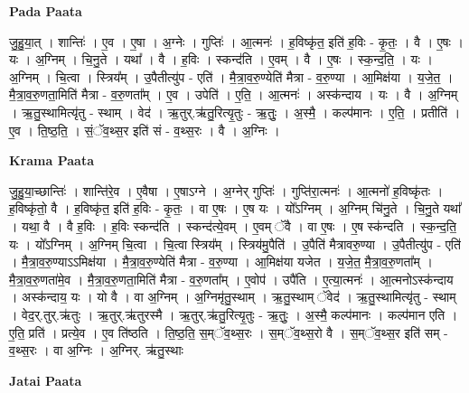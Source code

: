 \documentclass[17pt]{extarticle}
\begin{document}
\textbf{Pada Paata} \newline

जु॒हु॒या॒त् । शान्तिः॑ । ए॒व । ए॒षा । अ॒ग्नेः । गुप्तिः॑ । आ॒त्मनः॑ । ह॒विष्कृ॑त॒ इति॑ ह॒विः - कृ॒तः॒ । वै । ए॒षः । यः । अ॒ग्निम् । चि॒नु॒ते । यथा᳚ । वै । ह॒विः । स्कन्द॑ति । ए॒वम् । वै । ए॒षः । स्क॒न्द॒ति॒ । यः । अ॒ग्निम् । चि॒त्वा । स्त्रिय᳚म् । उ॒पैतीत्यु॑प - एति॑ । मै॒त्रा॒व॒रु॒ण्येति॑ मैत्रा - व॒रु॒ण्या । आ॒मिक्ष॑या । य॒जे॒त॒ । मै॒त्रा॒व॒रु॒णता॒मिति॑ मैत्रा - व॒रु॒णता᳚म् । ए॒व । उपेति॑ । ए॒ति॒ । आ॒त्मनः॑ । अस्क॑न्दाय । यः । वै । अ॒ग्निम् । ऋ॒तु॒स्थामित्यृ॑तु - स्थाम् । वेद॑ । ऋ॒तुर्.ऋ॑तु॒रित्यृ॒तुः - ऋ॒तुः॒ । अ॒स्मै॒ । कल्प॑मानः । ए॒ति॒ । प्रतीति॑ । ए॒व । ति॒ष्ठ॒ति॒ । सं॒ॅव॒थ्स॒र इति॑ सं - व॒थ्स॒रः । वै । अ॒ग्निः ।  \newline


\textbf{Krama Paata} \newline

जु॒हु॒या॒च्छान्तिः॑ । शान्ति॑रे॒व । ए॒वैषा । ए॒षाऽग्ने । अ॒ग्नेर् गुप्तिः॑ । गुप्ति॑रा॒त्मनः॑ । आ॒त्मनो॑ ह॒विष्कृ॑तः । ह॒विष्कृ॑तो॒ वै । ह॒विष्कृ॑त॒ इति॑ ह॒विः - कृ॒तः॒ । वा ए॒षः । ए॒ष यः । यो᳚ऽग्निम् । अ॒ग्निम् चि॑नु॒ते । चि॒नु॒ते यथा᳚ । यथा॒ वै । वै ह॒विः । ह॒विः स्कन्द॑ति । स्कन्द॑त्ये॒वम् । ए॒वम् ॅवै । वा ए॒षः । ए॒ष स्क॑न्दति । स्क॒न्द॒ति॒ यः । यो᳚ऽग्निम् । अ॒ग्निम् चि॒त्वा । चि॒त्वा स्त्रिय᳚म् । स्त्रिय॑मु॒पैति॑ । उ॒पैति॑ मैत्रावरु॒ण्या । उ॒पैतीत्यु॑प - एति॑ । मै॒त्रा॒व॒रु॒ण्याऽऽमिक्ष॑या । मै॒त्रा॒व॒रु॒ण्येति॑ मैत्रा - व॒रु॒ण्या । आ॒मिक्ष॑या यजेत । य॒जे॒त॒ मै॒त्रा॒व॒रु॒णता᳚म् । मै॒त्रा॒व॒रु॒णता॑मे॒व । मै॒त्रा॒व॒रु॒णता॒मिति॑ मैत्रा - व॒रु॒णता᳚म् । ए॒वोप॑ । उपै॑ति । ए॒त्या॒त्मनः॑ । आ॒त्मनोऽस्क॑न्दाय । अस्क॑न्दाय॒ यः । यो वै । वा अ॒ग्निम् । अ॒ग्निमृ॑तु॒स्थाम् । ऋ॒तु॒स्थाम् ॅवेद॑ । ऋ॒तु॒स्थामित्यृ॑तु - स्थाम् । वेद॒र्.तुर्.ऋ॑तुः । ऋ॒तुर्.ऋ॑तुरस्मै । ऋ॒तुर्.ऋ॑तु॒रित्यृ॒तुः - ऋ॒तुः॒ । अ॒स्मै॒ कल्प॑मानः । कल्प॑मान एति । ए॒ति॒ प्रति॑ । प्रत्ये॒व । ए॒व ति॑ष्ठति । ति॒ष्ठ॒ति॒ स॒म्ॅव॒थ्स॒रः । स॒म्ॅव॒थ्स॒रो वै । स॒म्ॅव॒थ्स॒र इति॑ सम् - व॒थ्स॒रः । वा अ॒ग्निः । अ॒ग्निर्. ऋ॑तु॒स्थाः \newline

\textbf{Jatai Paata} \newline
\end{document}

